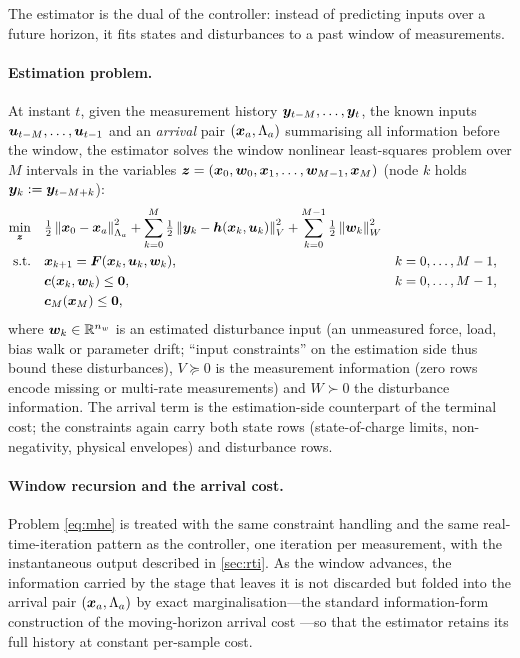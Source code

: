 The estimator is the dual of the controller: instead of predicting inputs over a
future horizon, it fits states and disturbances to a past window of measurements.

\paragraph{Estimation problem.} At instant $t$, given the measurement history
$\bm{y}_{t-M},\dots,\bm{y}_t$, the known inputs $\bm{u}_{t-M},\dots,\bm{u}_{t-1}$ and
an \emph{arrival} pair $(\bm{x}_a,\Lambda_a)$ summarising all information before
the window, the estimator solves the window nonlinear least-squares problem over
$M$ intervals in the variables $\bm{z}=(\bm{x}_0,\bm{w}_0,\bm{x}_1,\dots,\bm{w}_{M-1},\bm{x}_M)$
(node $k$ holds $\bm{y}_k:=\bm{y}_{t-M+k}$):
\begin{subequations}
\label{eq:mhe}
\begin{align}
\min_{\bm{z}}\quad
&\tfrac12\left\lVert \bm{x}_0-\bm{x}_a \right\rVert_{\Lambda_a}^2
+\sum_{k=0}^{M}\tfrac12\left\lVert \bm{y}_k-\bm{h}(\bm{x}_k,\bm{u}_k) \right\rVert_V^2
+\sum_{k=0}^{M-1}\tfrac12\left\lVert \bm{w}_k \right\rVert_W^2\\
\text{s.t.}\quad
&\bm{x}_{k+1}=\bm{F}(\bm{x}_k,\bm{u}_k,\bm{w}_k), && k=0,\dots,M-1,\\
&\bm{c}(\bm{x}_k,\bm{w}_k)\le\bm{0}, && k=0,\dots,M-1,\\
&\bm{c}_M(\bm{x}_M)\le\bm{0},
\end{align}
\end{subequations}
where $\bm{w}_k\in\mathbb{R}^{n_w}$ is an estimated disturbance input (an unmeasured
force, load, bias walk or parameter drift; ``input constraints'' on the
estimation side thus bound these disturbances), $V\succeq0$ is the measurement
information (zero rows encode missing or multi-rate measurements) and $W\succ0$
the disturbance information. The arrival term is the estimation-side counterpart
of the terminal cost; the constraints again carry both state rows (state-of-charge
limits, non-negativity, physical envelopes) and disturbance rows.

\paragraph{Window recursion and the arrival cost.} Problem \cref{eq:mhe} is
treated with the same constraint handling and the same real-time-iteration
pattern as the controller, one iteration per measurement, with the
instantaneous output described in \cref{sec:rti}. As the window advances, the
information carried by the stage that leaves it is not discarded but folded into
the arrival pair $(\bm{x}_a,\Lambda_a)$ by exact marginalisation---the standard
information-form construction of the moving-horizon arrival cost
\cite{rao2003constrained,rawlings2017model}---so that the estimator retains
its full history at constant per-sample cost.

